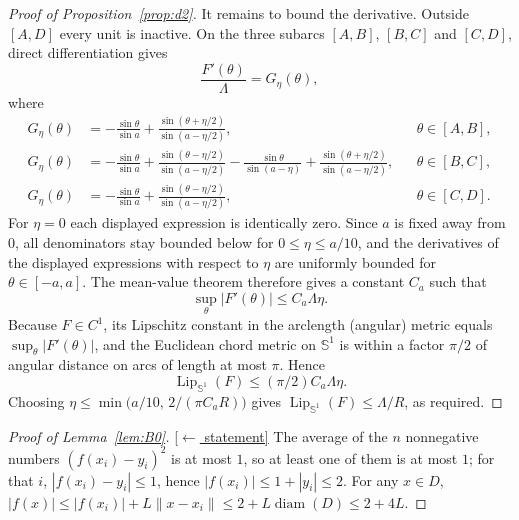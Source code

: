 \documentclass[11pt,reqno]{amsart}
\theoremstyle{plain}
\theoremstyle{definition}
\theoremstyle{remark}
\newcommand{\Lip}{\operatorname{Lip}}
\newcommand{\stmtbutton}[1]{\hyperref[#1]{\textnormal{\footnotesize\textsf{[$\leftarrow$ statement]}}}}
\begin{document}
\begin{proof}[Proof of Proposition~\textup{\ref{prop:d2}}]
It remains to bound the derivative.  Outside $[A,D]$ every unit is inactive.  On the three subarcs $[A,B]$, $[B,C]$ and $[C,D]$, direct differentiation gives
\[
\frac{F'(\theta)}{\Lambda}=G_\eta(\theta),
\]
where
\[
\begin{aligned}
G_\eta(\theta)&=-\frac{\sin\theta}{\sin a}+\frac{\sin(\theta+\eta/2)}{\sin(a-\eta/2)}, &&\theta\in[A,B],\\
G_\eta(\theta)&=-\frac{\sin\theta}{\sin a}+\frac{\sin(\theta-\eta/2)}{\sin(a-\eta/2)}-\frac{\sin\theta}{\sin(a-\eta)}+
        \frac{\sin(\theta+\eta/2)}{\sin(a-\eta/2)}, &&\theta\in[B,C],\\
G_\eta(\theta)&=-\frac{\sin\theta}{\sin a}+\frac{\sin(\theta-\eta/2)}{\sin(a-\eta/2)}, &&\theta\in[C,D].
\end{aligned}
\]
For $\eta=0$ each displayed expression is identically zero.  Since $a$ is fixed away from $0$, all denominators stay bounded below for $0\le\eta\le a/10$, and the derivatives of the displayed expressions with respect to $\eta$ are uniformly bounded for $\theta\in[-a,a]$.  The mean-value theorem therefore gives a constant $C_a$ such that
\[
        \sup_\theta |F'(\theta)|\le C_a\Lambda\eta .
\]
Because $F\in C^1$, its Lipschitz constant in the arclength (angular) metric equals $\sup_\theta|F'(\theta)|$, and the Euclidean chord metric on $\mathbb S^1$ is within a factor $\pi/2$ of angular distance on arcs of length at most $\pi$.  Hence
\[
        \Lip_{\mathbb S^1}(F)\le (\pi/2)C_a\Lambda\eta.
\]
Choosing $\eta\le\min\bigl(a/10,\,2/(\pi C_a R)\bigr)$ gives $\Lip_{\mathbb S^1}(F)\le\Lambda/R$, as required.
\end{proof}

\begin{proof}[Proof of Lemma~\textup{\ref{lem:B0}}]\label{proof:B0}\stmtbutton{lem:B0}
The average of the $n$ nonnegative numbers $(f(x_i)-y_i)^2$ is at most $1$, so at least one of them is at most $1$; for that $i$, $|f(x_i)-y_i|\le1$, hence $|f(x_i)|\le1+|y_i|\le2$. For any $x\in D$, $|f(x)|\le|f(x_i)|+L\|x-x_i\|\le2+L\operatorname{diam}(D)\le2+4L$.
\end{proof}
\end{document}
